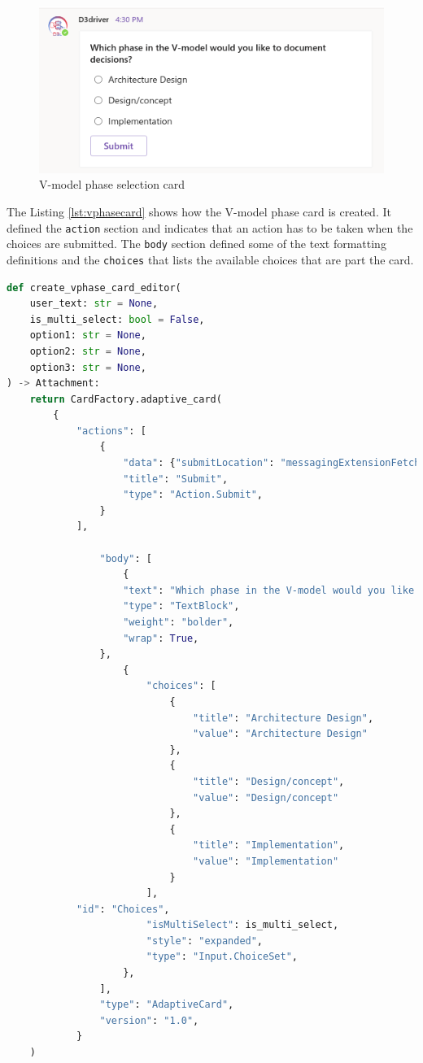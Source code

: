  
\begin{figure}[h]
\centering
\includegraphics[width=0.7\linewidth]{figures/vphasecard}
\captionsetup{justification=centering}
\caption{V-model phase selection card}
\label{fig:vphasecard}
\end{figure} 


The Listing \ref{lst:vphasecard} shows how the V-model phase card is created. It defined the \texttt{action} section and indicates that an action has to be taken when the choices are submitted. The \texttt{body} section defined some of the text formatting definitions and the \texttt{choices} that lists the available choices that are part the card. 

\begin{lstlisting}[caption={V-model phase card},label={lst:vphasecard},language=python]
def create_vphase_card_editor(
    user_text: str = None,
    is_multi_select: bool = False,
    option1: str = None,
    option2: str = None,
    option3: str = None,
) -> Attachment:
    return CardFactory.adaptive_card(
        {
            "actions": [
                {
                    "data": {"submitLocation": "messagingExtensionFetchTask", "type" : "vmodelinit"},
                    "title": "Submit",
                    "type": "Action.Submit",
                }
            ],

                "body": [
                    {
                    "text": "Which phase in the V-model would you like to document decisions?",
                    "type": "TextBlock",
                    "weight": "bolder",
                    "wrap": True,
                },
                    {
                        "choices": [
                            {
                                "title": "Architecture Design",
                                "value": "Architecture Design"
                            },
                            {
                                "title": "Design/concept",
                                "value": "Design/concept"
                            },
                            {
                                "title": "Implementation",
                                "value": "Implementation"
                            }   
                        ],
			"id": "Choices",
                    	"isMultiSelect": is_multi_select,
                    	"style": "expanded",
                    	"type": "Input.ChoiceSet",
                    },
                ],
		        "type": "AdaptiveCard",
            	"version": "1.0",
            }
    )
\end{lstlisting}


